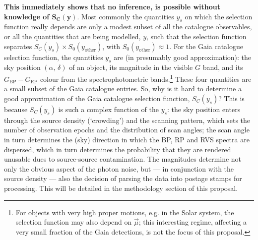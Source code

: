\textbf{This immediately shows that no inference, is possible without knowledge of $\mathbf{S_C(y)}$}. Most commonly the quantities $y_s$ on which the selection function really depends are only a modest subset of all the catalogue observables, or all the quantities that are being modelled, $y$, such that the selection function separates $S_C(y_s) \times S_0(y_\mathrm{other})$, with $S_0(y_\mathrm{other})\approx 1$. For the Gaia catalogue selection function, the quantities $y_s$ are (in presumably good approximation): the sky position $(\alpha,\,\delta)$ of an object, its magnitude in the visible $G$ band, and its $G_\mathrm{BP}-G_\mathrm{RP}$ colour from the spectrophotometric bands.\footnote{For objects with very high proper motions, e.g. in the Solar system, the selection function may also depend on $\vec{\mu}$; this interesting regime, affecting a very small fraction of the Gaia detections, is not the focus of this proposal.} These four quantities are a small subset of the Gaia catalogue entries. So, why is it hard to determine a good approximation of the Gaia catalogue selection function, $S_C(y_s)$? This is because $S_C(y_s)$ is such a complex function of the $y_s$: the sky position enters through the source density (`crowding') and the scanning pattern, which sets the number of observation epochs and the distribution of scan angles; the scan angle in turn determines the (sky) direction in which the BP, RP and RVS spectra are dispersed, which in turn determines the probability that they are rendered unusable dues to source-source contamination. The magnitudes determine not only the obvious aspect of the photon noise, but --- in conjunction with the source density --- also the decision of parsing the data into postage stamps for processing. This will be detailed in the methodology section of this proposal.

